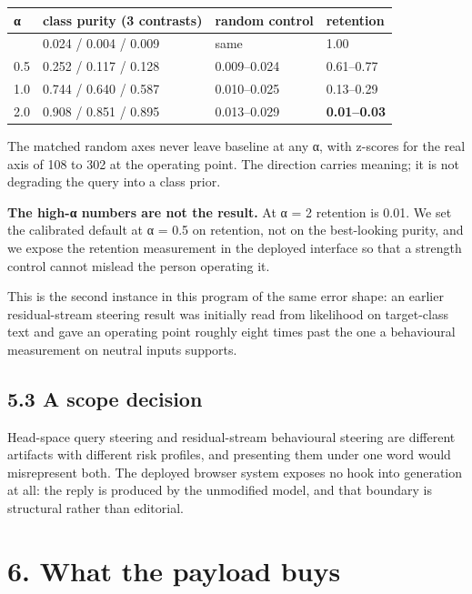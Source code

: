 \documentclass[
  11pt,
]{article}
\newcounter{none} %
\begin{document}
{\def\LTcaptype{none} %
\begin{longtable}[]{@{}llll@{}}
\toprule\noalign{}
α & class purity (3 contrasts) & random control & retention \\
\midrule\noalign{}
\endhead
\bottomrule\noalign{}
\endlastfoot
0 & 0.024 / 0.004 / 0.009 & same & 1.00 \\
0.5 & 0.252 / 0.117 / 0.128 & 0.009--0.024 & 0.61--0.77 \\
1.0 & 0.744 / 0.640 / 0.587 & 0.010--0.025 & 0.13--0.29 \\
2.0 & 0.908 / 0.851 / 0.895 & 0.013--0.029 & \textbf{0.01--0.03} \\
\end{longtable}
}

The matched random axes never leave baseline at any α, with z-scores for
the real axis of 108 to 302 at the operating point. The direction
carries meaning; it is not degrading the query into a class prior.

\textbf{The high-α numbers are not the result.} At α = 2 retention is
0.01. We set the calibrated default at α = 0.5 on retention, not on the
best-looking purity, and we expose the retention measurement in the
deployed interface so that a strength control cannot mislead the person
operating it.

This is the second instance in this program of the same error shape: an
earlier residual-stream steering result was initially read from
likelihood on target-class text and gave an operating point roughly
eight times past the one a behavioural measurement on neutral inputs
supports.

\subsection{5.3 A scope decision}\label{a-scope-decision}

Head-space query steering and residual-stream behavioural steering are
different artifacts with different risk profiles, and presenting them
under one word would misrepresent both. The deployed browser system
exposes no hook into generation at all: the reply is produced by the
unmodified model, and that boundary is structural rather than editorial.

\section{6. What the payload buys}\label{what-the-payload-buys}
\end{document}

